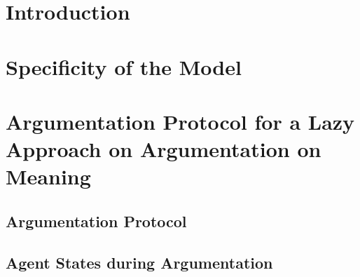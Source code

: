 \section{Introduction}

\section{Specificity of the Model}

\section{Argumentation Protocol for a Lazy Approach on Argumentation on Meaning}

\subsection{Argumentation Protocol}

\subsection{Agent States during Argumentation}